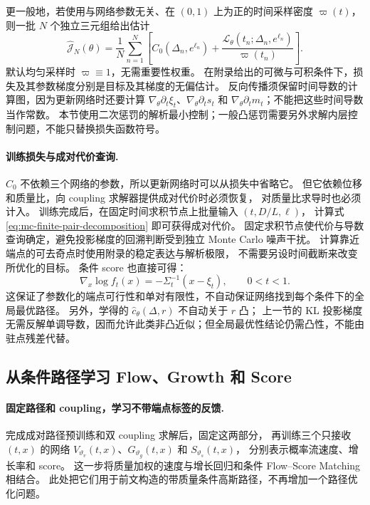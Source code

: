 \documentclass[UTF8,a4paper,11pt,fontset=fandol]{ctexart}
\begin{document}
更一般地，若使用与网络参数无关、在 $(0,1)$ 上为正的时间采样密度 $\varpi(t)$，
则一批 $N$ 个独立三元组给出估计
\begin{equation}
\widehat{\mathcal J}_N(\theta)
=\frac1N\sum_{n=1}^N
\left[C_0(\Delta_n,e^{\ell_n})
+\frac{\mathcal L_\theta(t_n;\Delta_n,e^{\ell_n})}{\varpi(t_n)}\right].
\label{eq:mc-pair-training-estimator}
\end{equation}
默认均匀采样时 $\varpi\equiv1$，无需重要性权重。
在附录给出的可微与可积条件下，损失及其参数梯度分别是目标及其梯度的无偏估计。
反向传播须保留时间导数的计算图，因为更新网络时还要计算
$\nabla_\theta\partial_t\xi_t$、$\nabla_\theta\partial_ts_t$ 和
$\nabla_\theta\partial_tm_t$；不能把这些时间导数当作常数。
本节使用二次惩罚的解析最小控制；一般凸惩罚需要另外求解内层控制问题，不能只替换损失函数符号。

\paragraph{训练损失与成对代价查询.}
$C_0$ 不依赖三个网络的参数，所以更新网络时可以从损失中省略它。
但它依赖位移和质量比，向 coupling 求解器提供成对代价时必须恢复，
对质量比求导时也必须计入。
训练完成后，在固定时间求积节点上批量输入 $(t,D/L,\ell)$，
计算式 \eqref{eq:mc-finite-pair-decomposition} 即可获得成对代价。
固定求积节点使代价与导数查询确定，避免投影梯度的回溯判断受到独立 Monte Carlo 噪声干扰。
计算靠近端点的可去奇点时使用附录的稳定表达与解析极限，
不需要另设时间截断来改变所优化的目标。
条件 score 也直接可得：
\begin{equation}
\nabla_x\log f_t(x)=-\Sigma_t^{-1}(x-\xi_t),\qquad 0<t<1.
\end{equation}
这保证了参数化的端点可行性和单对有限性，不自动保证网络找到每个条件下的全局最优路径。
另外，学得的 $\widehat c_\theta(\Delta,r)$ 不自动关于 $r$ 凸；
上一节的 KL 投影梯度无需反解单调导数，因而允许此类非凸近似；但全局最优性结论仍需凸性，不能由驻点残差代替。

\clearpage
\subsection*{从条件路径学习 Flow、Growth 和 Score}

\paragraph{固定路径和 coupling，学习不带端点标签的反馈.}
完成成对路径预训练和双 coupling 求解后，固定这两部分，
再训练三个只接收 $(t,x)$ 的网络
$V_{\vartheta_v}(t,x)$、$G_{\vartheta_g}(t,x)$ 和 $S_{\vartheta_s}(t,x)$，
分别表示概率流速度、增长率和 score。
这一步将质量加权的速度与增长回归和条件 Flow--Score Matching 相结合。
此处把它们用于前文构造的带质量条件高斯路径，不再增加一个路径优化问题。
\end{document}
